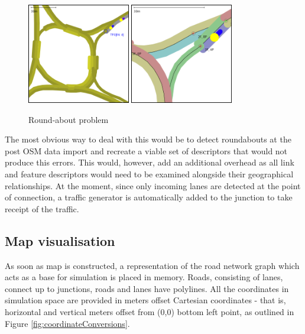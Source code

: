 \begin{figure}[!h]
	\vspace{1.5em}
  	\caption{Round-about problem}
  	\label{fig:roundAbout}
  	\centering
	\includegraphics[width=0.4\textwidth]{figs/graphConstruction/RoundAbout1.png}
	\hspace{0.2em}
	\includegraphics[width=0.40\textwidth]{figs/graphConstruction/RoundAbout2.png}
  	\vspace{1.5em}
\end{figure}

The most obvious way to deal with this would be to detect roundabouts at the post OSM data import and recreate a viable set of descriptors that would not produce this errors. This would, however, add an additional overhead as all link and feature descriptors would need to be examined alongside their geographical relationships. At the moment, since only incoming lanes are detected at the point of connection, a traffic generator is automatically added to the junction to take receipt of the traffic.

\subsection{Map visualisation}
As soon as map is constructed, a representation of the road network graph which acts as a base for simulation is placed in memory. Roads, consisting of lanes, connect up to junctions, roads and lanes have polylines. All the coordinates in simulation space are provided in meters offset Cartesian coordinates - that is, horizontal and vertical meters offset from (0,0) bottom left point, as outlined in Figure \ref{fig:coordinateConversions}.

